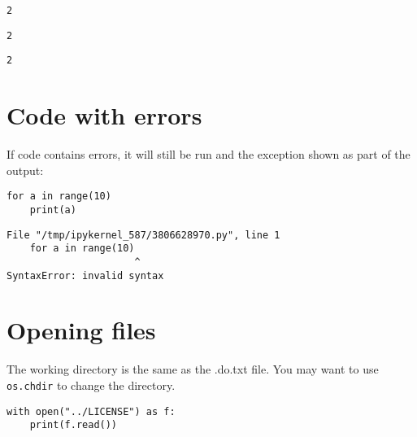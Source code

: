 \documentclass[%
oneside,                 %
final,                   %
chapterprefix=true,      %
open=right,              %
10pt]{book}
\begin{document}
\begin{Verbatim}[numbers=none,fontsize=\fontsize{9pt}{9pt},baselinestretch=0.95]
2
\end{Verbatim}



\begin{Verbatim}[numbers=none,fontsize=\fontsize{9pt}{9pt},baselinestretch=0.95]
2

\end{Verbatim}

\begin{Verbatim}[numbers=none,fontsize=\fontsize{9pt}{9pt},baselinestretch=0.95]
2
\end{Verbatim}

\section{Code with errors}

If code contains errors, it will still be run and the exception shown as part
of the output:




\begin{Verbatim}[numbers=none,fontsize=\fontsize{9pt}{9pt},baselinestretch=0.95]
for a in range(10)
    print(a)

\end{Verbatim}

\begin{Verbatim}[numbers=none,fontsize=\fontsize{9pt}{9pt},baselinestretch=0.95]
  File "/tmp/ipykernel_587/3806628970.py", line 1
    for a in range(10)
                      ^
SyntaxError: invalid syntax
\end{Verbatim}

\section{Opening files}

The working directory is the same as the .do.txt file.
You may want to use \texttt{os.chdir} to change the directory.




\begin{Verbatim}[numbers=none,fontsize=\fontsize{9pt}{9pt},baselinestretch=0.95]
with open("../LICENSE") as f:
    print(f.read())

\end{Verbatim}
\end{document}
